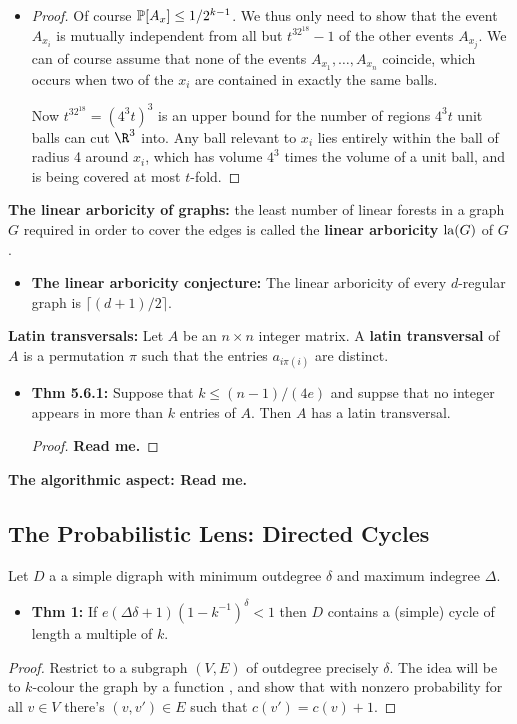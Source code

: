 \documentclass[11pt]{article}
\newenvironment{INT}[1][]{\begin{itemize}\small\item\textbf{#1}}{\end{itemize}}
\begin{document}
\begin{chapter5}
\begin{itemise}
\begin{INT}
\begin{proof}
\INDENT Of course $\operatorname{\mathbb{P}}[A_x]\leq1/2^{k-1}$. We thus only need to show that the event $A_{x_i}$ is mutually independent from all but $t^32^{18}-1$ of the other events $A_{x_j}$. We can of course assume that none of the events $A_{x_1},\ldots,A_{x_n}$ coincide, which occurs when two of the $x_i$ are contained in exactly the same balls.

\INDENT Now $t^32^{18}=(4^3t)^3$ is an upper bound for the number of regions $4^3t$ unit balls can cut $\R^3$ into. Any ball relevant to $x_i$ lies entirely within the ball of radius 4 around $x_i$, which has volume $4^3$ times the volume of a unit ball, and is being covered at most $t$-fold.
\end{proof}
\end{INT}
\item \textbf{The linear arboricity of graphs:} the least number of linear forests in a graph $G$ required in order to cover the edges is called the \textbf{linear arboricity} $\textup{la}(G)$ of $G$.
\begin{INT}[The linear arboricity conjecture:]
The linear arboricity of every $d$-regular graph is $\lceil (d+1)/2\rceil$.
\end{INT}
\item \textbf{Latin transversals:} Let $A$ be an $n\times n$ integer matrix. A \textbf{latin transversal} of $A$ is a permutation $\pi$ such that the entries $a_{i\pi(i)}$ are distinct.
\begin{INT}[Thm 5.6.1:]
Suppose that $k\leq(n-1)/(4e)$ and suppse that no integer appears in more than $k$ entries of $A$. Then $A$ has a latin transversal.
\begin{proof}
\textbf{Read me.}
\end{proof}
\end{INT}
\item \textbf{The algorithmic aspect: Read me.}
\end{itemise}
\subsection*{The Probabilistic Lens: Directed Cycles}
Let $D$ a a simple digraph with minimum outdegree $\delta$ and maximum indegree $\Delta$.
\begin{INT}[Thm 1:]
If $e(\Delta\delta+1)(1-k^{-1})^\delta<1$ then $D$ contains a (simple) cycle of length a multiple of $k$.
\end{INT}
\begin{proof}
Restrict to a subgraph $(V,E)$ of outdegree precisely $\delta$. The idea will be to $k$-colour the graph by a function , and show that with nonzero probability for all $v\in V$ there's $(v,v')\in E$ such that $c(v')=c(v)+1$.


\end{proof}
\end{chapter5}
\end{document}
